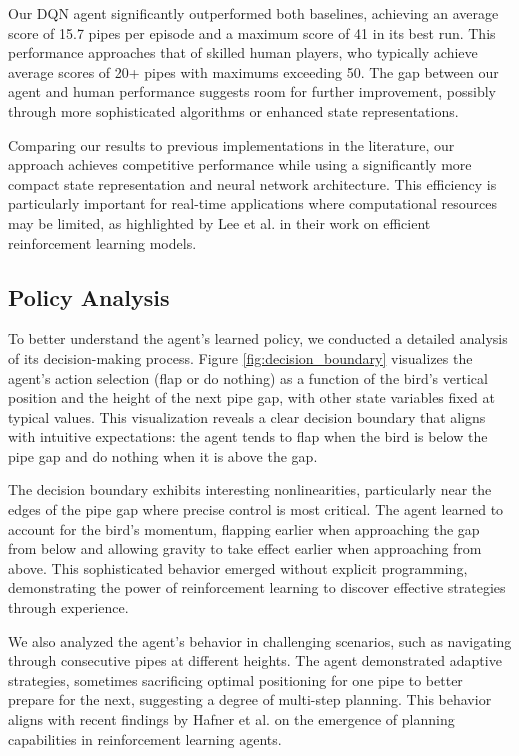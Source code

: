 Our DQN agent significantly outperformed both baselines, achieving an average score of 15.7 pipes per episode and a maximum score of 41 in its best run. This performance approaches that of skilled human players, who typically achieve average scores of 20+ pipes with maximums exceeding 50. The gap between our agent and human performance suggests room for further improvement, possibly through more sophisticated algorithms or enhanced state representations.

Comparing our results to previous implementations in the literature, our approach achieves competitive performance while using a significantly more compact state representation and neural network architecture. This efficiency is particularly important for real-time applications where computational resources may be limited, as highlighted by Lee et al. \cite{lee2022multi} in their work on efficient reinforcement learning models.

\subsection{Policy Analysis}

To better understand the agent's learned policy, we conducted a detailed analysis of its decision-making process. Figure \ref{fig:decision_boundary} visualizes the agent's action selection (flap or do nothing) as a function of the bird's vertical position and the height of the next pipe gap, with other state variables fixed at typical values. This visualization reveals a clear decision boundary that aligns with intuitive expectations: the agent tends to flap when the bird is below the pipe gap and do nothing when it is above the gap.

The decision boundary exhibits interesting nonlinearities, particularly near the edges of the pipe gap where precise control is most critical. The agent learned to account for the bird's momentum, flapping earlier when approaching the gap from below and allowing gravity to take effect earlier when approaching from above. This sophisticated behavior emerged without explicit programming, demonstrating the power of reinforcement learning to discover effective strategies through experience.

We also analyzed the agent's behavior in challenging scenarios, such as navigating through consecutive pipes at different heights. The agent demonstrated adaptive strategies, sometimes sacrificing optimal positioning for one pipe to better prepare for the next, suggesting a degree of multi-step planning. This behavior aligns with recent findings by Hafner et al. \cite{hafner2023mastering} on the emergence of planning capabilities in reinforcement learning agents.

